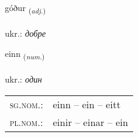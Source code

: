 \documentclass[frontgrid, backgrid]{flacards}\usepackage[]{graphicx}\usepackage[]{xcolor}
\begin{document}
\renewcommand{\flhead}{\vskip5pt \fboxsep=0pt {\small\bfseries\footnotesize Lýsingarorð | прикметник}}
\renewcommand{\fcfoot}{\vskip5pt \fboxsep=0pt \hspace{2pt}{\small\bfseries\footnotesize 1K}}

\renewcommand{\blhead}{\vskip5pt {\small\bfseries\footnotesize Lýsingarorð | прикметник }}
\renewcommand{\bcfoot}{\vskip5pt \hspace{2pt}{\small\bfseries\footnotesize 1K}}


{góður \small{\textsubscript{(\textit{adj.})}} \\[1ex] %
\textphonetic{[kouːðʏr]} \\
ukr.: \emph{добре} \\  [2ex]
\renewcommand*{\arraystretch}{0.8}
}

\renewcommand{\flhead}{\vskip5pt \fboxsep=0pt {\small\bfseries\footnotesize Töluorð | чисельник}}
\renewcommand{\fcfoot}{\vskip5pt \fboxsep=0pt \hspace{2pt}{\small\bfseries\footnotesize 1K}}

\renewcommand{\blhead}{\vskip5pt {\small\bfseries\footnotesize Töluorð | чисельник }}
\renewcommand{\bcfoot}{\vskip5pt \hspace{2pt}{\small\bfseries\footnotesize 1K}}


{einn \small{\textsubscript{(\textit{num.})}} \\[1ex] %
\textphonetic{[eitn̥]} \\
ukr.: \emph{один} \\  [2ex]
\renewcommand*{\arraystretch}{0.8}
\begin{tabular}{ll}
\textsc{sg.nom.}: & einn  --  ein -- eitt \\ 
\textsc{pl.nom.}: & einir -- einar -- ein
\end{tabular}
}
\end{document}
